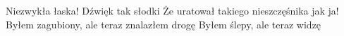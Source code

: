 Niezwykła łaska!
Dźwięk tak słodki
Że uratował takiego
nieszczęśnika jak ja!
Byłem zagubiony,
ale teraz znalazłem drogę
Byłem ślepy, ale teraz widzę 
